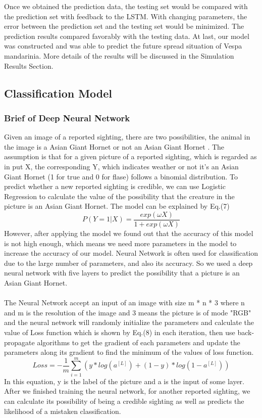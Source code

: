 \documentclass{mcmthesis}
\begin{document}
Once we obtained the prediction data, the testing set would be compared with the prediction set with feedback to the LSTM. With changing parameters, the error between the prediction set and the testing set would be minimized. The prediction results compared favorably with the testing data. At last, our model was constructed and was able to predict the future spread situation of Vespa mandarinia. More details of the results will be discussed in the Simulation Results Section.


\subsection{Classification Model}

\subsubsection{Brief of Deep Neural Network}
Given an image of a reported sighting, there are two possibilities, the animal in the image is a Asian Giant Hornet or not an Asian Giant Hornet . The assumption is that for a given picture of a reported sighting, which is regarded as in put X, the corresponding Y, which indicates weather or not it's an Asian Giant Hornet (1 for true and 0 for flase) follows a binomial distribution. To predict whether a new reported sighting is credible, we can use Logistic Regression to calculate the value of the possibility that the creature in the picture is an Asian Giant Hornet. The model can be explained by Eq.(7)
\begin{equation}
    P(Y=1|X) = \frac{exp(\omega X)}{1 + exp(\omega X)} 
\end{equation} \label{logistic}
However, after applying the model we found out that the accuracy of this model is not high enough, which means we need more parameters in the model to increase the accuracy of our model. 
Neural Network is often used for classification due to the large number of parameters, and also its accuracy. So we used a deep neural network with five layers to predict the possibility that a picture is an Asian Giant Hornet.
\paragraph{ } The Neural Network accept an input of an image with size m * n * 3 where n and m is the resolution of the image and 3 means the picture is of mode "RGB" and the neural network will randomly initialize the parameters and calculate the value of Loss function which is shown by Eq.(8) in each iteration, then use back-propagate algorithms to 
get the gradient of each parameters and update the parameters along its gradient to find the minimum of the values of loss function.
\begin{equation}
    Loss = - \frac{1}{m} \sum_{i=1}^m (y*log(a^{[L]})+(1-y)*log(1-a^{[L]}))
\end{equation}
In this equation, y is the label of the picture and a is the input of some layer.
After we finished training the neural network, for another reported sighting, we can calculate its possibility of being a credible sighting as well as predicts the likelihood of a mistaken classification.
\end{document}
